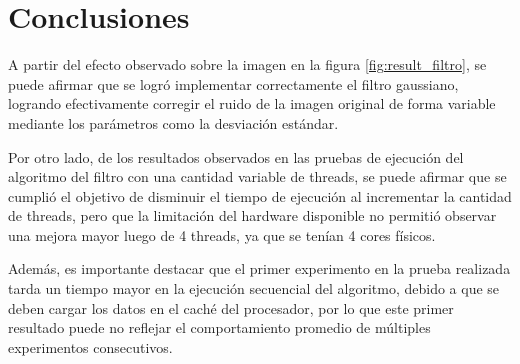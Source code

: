 \documentclass {article}
\begin{document}
\section{Conclusiones}
A partir del efecto observado sobre la imagen en la figura \ref{fig:result_filtro}, se puede afirmar
que se logró implementar correctamente el filtro gaussiano, logrando efectivamente corregir el ruido
de la imagen original de forma variable mediante los parámetros como la desviación estándar.

Por otro lado, de los resultados observados en las pruebas de ejecución del algoritmo del filtro con
una cantidad variable de threads, se puede afirmar que se cumplió el objetivo de disminuir el tiempo
de ejecución al incrementar la cantidad de threads, pero que la limitación del hardware disponible
no permitió observar una mejora mayor luego de 4 threads, ya que se tenían 4 cores físicos.

Además, es importante destacar que el primer experimento en la prueba realizada tarda un tiempo
mayor en la ejecución secuencial del algoritmo, debido a que se deben cargar los datos en el caché
del procesador, por lo que este primer resultado puede no reflejar el comportamiento promedio de
múltiples experimentos consecutivos.




\end{document}
